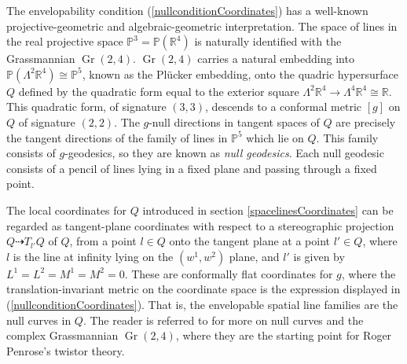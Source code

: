 \documentclass[12pt]{article}
\numberwithin{equation}{section}
\theoremstyle{plain}
\theoremstyle{definition}
\renewcommand{\P}{\mathbb{P}}
\renewcommand{\L}{\Lambda}
\newcommand{\R}{\mathbb{R}}
\newcommand{\ra}{\rightarrow}
\begin{document}
The envelopability condition (\ref{nullconditionCoordinates}) has a well-known projective-geometric and algebraic-geometric interpretation. The space of lines in the real projective space $\P^{3}=\P(\R^{4})$ is naturally identified with the Grassmannian $\operatorname{Gr}(2,4)$. $\operatorname{Gr}(2,4)$ carries a natural embedding into $\P(\L^{2}\R^{4})\cong \P^{5}$, known as the Pl\"ucker embedding, onto the quadric hypersurface $Q$ defined by the quadratic form equal to the exterior square $\L^{2}\R^{4}\ra \L^{4}\R^{4}\cong \R$. This quadratic form, of signature $(3,3)$, descends to a conformal metric $[g]$ on $Q$ of signature $(2,2)$. The $g$-null directions in tangent spaces of $Q$ are precisely the tangent directions of the family of lines in $\P^{5}$ which lie on $Q$. This family consists of $g$-geodesics, so they are known as \emph{null geodesics}. Each null geodesic consists of a pencil of lines lying in a fixed plane and passing through a fixed point.

The local coordinates for $Q$ introduced in section \ref{spacelinesCoordinates} can be regarded as tangent-plane coordinates with respect to a stereographic projection $Q\dashrightarrow T_{l'}Q$ of $Q$, from a point $l\in Q$ onto the tangent plane at a point $l'\in Q$, where $l$ is the line at infinity lying on the $(w^{1},w^{2})$ plane, and $l'$ is given by $L^{1}=L^{2}=M^{1}=M^{2}=0$. These are conformally flat coordinates for $g$, where the translation-invariant metric on the coordinate space is the expression displayed in (\ref{nullconditionCoordinates}). That is, the envelopable spatial line families are the null curves in $Q$. The reader is referred to \cite{ww} for more on null curves and the complex Grassmannian $\operatorname{Gr}(2,4)$, where they are the starting point for Roger Penrose's twistor theory.
\end{document}
